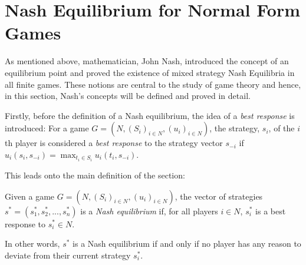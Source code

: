 \section{Nash Equilibrium for Normal Form Games}
As mentioned above, mathematician, John Nash, introduced the concept of an
equilibrium point and proved the existence of mixed strategy Nash Equilibria in
all finite games. These notions are central to the study of game
theory \cite{maschler_solan_zamir_2013} and hence, in this section, Nash's
concepts will be defined and proved in detail.

Firstly, before the definition of a Nash equilibrium, the idea of a
\textit{best response} is introduced:
For a game $G=(N, (S_{i})_{i \in N}, (u_{i})_{i \in N})$, the strategy, $s_{i}$,
of the $i$th player is considered a \textit{best response} to the strategy
vector $s_{-i}$ if $u_{i}(s_{i}, s_{-i}) = \max_{t_{i} \in S_{i}}u_{i}(t_{i},
s_{-i})$. \cite{maschler_solan_zamir_2013}

This leads onto the main definition of the section:
\begin{definition}
    Given a game $G=(N, (S_{i})_{i \in N}, (u_{i})_{i \in N})$, the vector of
    strategies $s^{*} = (s_{1}^{*}, s_{2}^{*}, ..., s_{n}^{*})$ is a
    \textit{Nash equilibrium} if, for all players $i \in N$, $s_{i}^{*}$ is a
    best response to $s_{i}^{*} \in N$. \cite{maschler_solan_zamir_2013}
\end{definition}
In other words, $s^{*}$ is a Nash equilibrium if and only if no player has any
reason to deviate from their current strategy $s_{i}^{*}$.

